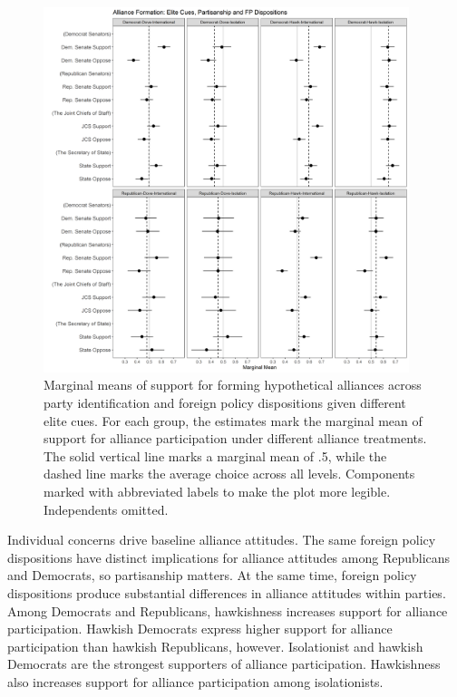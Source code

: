 \documentclass[12pt]{article}
\begin{document}
\begin{figure}[htpb]
	\centering
		\includegraphics[width=0.95\textwidth]{../figures/party-dispo-form-el.png}
	\caption{Marginal means of support for forming hypothetical alliances across party identification and foreign policy dispositions given different elite cues. For each group, the estimates mark the marginal mean of support for alliance participation under different alliance treatments. The solid vertical line marks a marginal mean of .5, while the dashed line marks the average choice across all levels. Components marked with abbreviated labels to make the plot more legible. Independents omitted.}
	\label{fig:party-dispo-form-el}
\end{figure}


Individual concerns drive baseline alliance attitudes. 
The same foreign policy dispositions have distinct implications for alliance attitudes among Republicans and Democrats, so partisanship matters.
At the same time, foreign policy dispositions produce substantial differences in alliance attitudes within parties.  
Among Democrats and Republicans, hawkishness increases support for alliance participation. 
Hawkish Democrats express higher support for alliance participation than hawkish Republicans, however. 
Isolationist and hawkish Democrats are the strongest supporters of alliance participation. 
Hawkishness also increases support for alliance participation among isolationists. 
\end{document}
